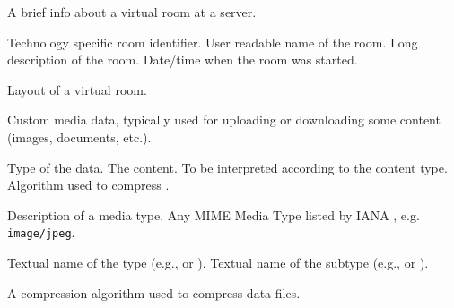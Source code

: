 \begin{Api}
A brief info about a virtual room at a server.
\begin{ApiClassAttributes}
 Technology specific room identifier.
 User readable name of the room.
 Long description of the room.
 Date/time when the room was started.
\end{ApiClassAttributes}

Layout of a virtual room.
\begin{ApiEnumValues}
\end{ApiEnumValues}

Custom media data, typically used for uploading or downloading some content (images, documents, etc.).
\begin{ApiClassAttributes}
 Type of the data.
 The content. To be interpreted according to the content type.
 Algorithm used to compress .
\end{ApiClassAttributes}

Description of a media type. Any MIME Media Type listed by IANA \cite{IANA-MediaTypes}, e.g. \texttt{image/jpeg}.
\begin{ApiClassAttributes}
 Textual name of the type (e.g.,  or ).
 Textual name of the subtype (e.g.,  or ).
\end{ApiClassAttributes}

A compression algorithm used to compress data files.
\begin{ApiEnumValues}
\end{ApiEnumValues}


\end{Api}


